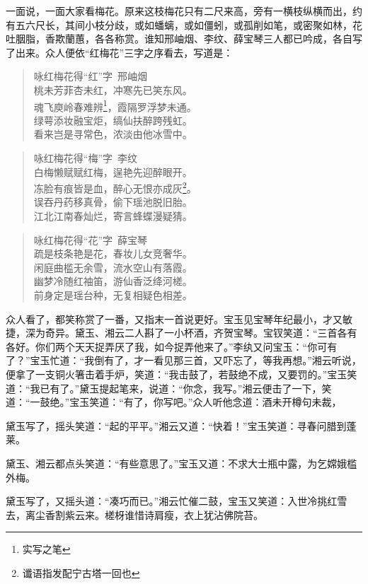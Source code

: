 \documentclass[12pt,oneside]{book}
\newenvironment{shici}{%
\begin{verse}%
\centering\large\hspace{12pt}}%
{\end{verse}}
\begin{document}
一面说，一面大家看梅花。原来这枝梅花只有二尺来高，旁有一横枝纵横而出，约有五六尺长，其间小枝分歧，或如蟠螭，或如僵蚓，或孤削如笔，或密聚如林，花吐胭脂，香欺蘭蕙，各各称赏。谁知邢岫烟、李纹、薛宝琴三人都已吟成，各自写了出来。众人便依“红梅花”三字之序看去，写道是：

\begin{shici}
咏红梅花得“红”字~邢岫烟\\
桃未芳菲杏未红，冲寒先已笑东风。\\
魂飞庾岭春难辨\footnote{实写之笔}，霞隔罗浮梦未通。\\
绿萼添妆融宝炬，缟仙扶醉跨残虹。\\
看来岂是寻常色，浓淡由他冰雪中。
\end{shici}

\begin{shici}
咏红梅花得“梅”字~李纹\\
白梅懒赋赋红梅，逞艳先迎醉眼开。\\
冻脸有痕皆是血，醉心无恨亦成灰\footnote{谶语指发配宁古塔一回也}。\\
误吞丹药移真骨，偷下瑶池脱旧胎。\\
江北江南春灿烂，寄言蜂蝶漫疑猜。
\end{shici}

\begin{shici}
咏红梅花得“花”字~薛宝琴\\
疏是枝条艳是花，春妆儿女竞奢华。\\
闲庭曲槛无余雪，流水空山有落霞。\\
幽梦冷随红袖笛，游仙香泛绛河槎。\\
前身定是瑶台种，无复相疑色相差。
\end{shici}


众人看了，都笑称赏了一番，又指末一首说更好。宝玉见宝琴年纪最小，才又敏捷，深为奇异。黛玉、湘云二人斟了一小杯酒，齐贺宝琴。宝钗笑道：“三首各有各好。你们两个天天捉弄厌了我，如今捉弄他来了。”李纨又问宝玉：“你可有了？”宝玉忙道：“我倒有了，才一看见那三首，又吓忘了，等我再想。”湘云听说，便拿了一支铜火箸击着手炉，笑道：“我击鼓了，若鼓绝不成，又要罚的。”宝玉笑道：“我已有了。”黛玉提起笔来，说道：“你念，我写。”湘云便击了一下，笑道：“一鼓绝。”宝玉笑道：“有了，你写吧。”众人听他念道：酒未开樽句未裁，

黛玉写了，摇头笑道：“起的平平。”湘云又道：“快着！”宝玉笑道：寻春问腊到蓬莱。

黛玉、湘云都点头笑道：“有些意思了。”宝玉又道：不求大士瓶中露，为乞嫦娥槛外梅。

黛玉写了，又摇头道：“凑巧而已。”湘云忙催二鼓，宝玉又笑道：入世冷挑红雪去，离尘香割紫云来。槎枒谁惜诗肩瘦，衣上犹沾佛院苔。
\end{document}
